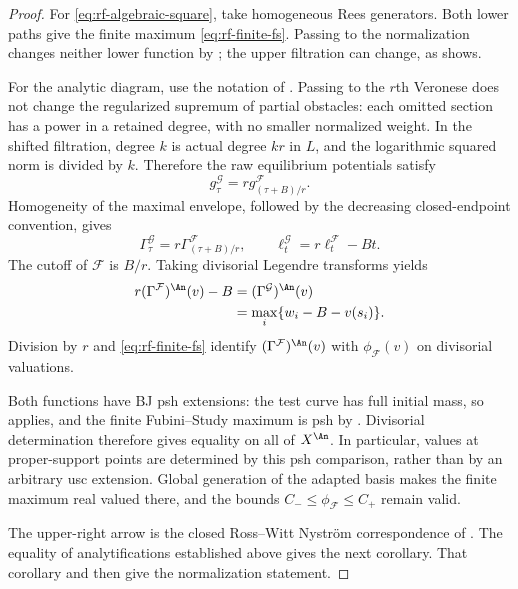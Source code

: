 \begin{proof}
For \eqref{eq:rf-algebraic-square}, take homogeneous Rees generators. Both lower paths give the finite maximum \eqref{eq:rf-finite-fs}. Passing to the normalization changes neither lower function by ; the upper filtration can change, as  shows.

For the analytic diagram, use the notation of . Passing to the $r$th Veronese does not change the regularized supremum of partial obstacles: each omitted section has a power in a retained degree, with no smaller normalized weight. In the shifted filtration, degree $k$ is actual degree $kr$ in $L$, and the logarithmic squared norm is divided by $k$. Therefore the raw equilibrium potentials satisfy
\[
                   g^{\mathcal G}_\tau
                      =r g^{\mathcal F}_{(\tau+B)/r}.
\]
Homogeneity of the maximal envelope, followed by the decreasing closed-endpoint convention, gives
\[
 \Gamma^{\mathcal G}_\tau=r\Gamma^{\mathcal F}_{(\tau+B)/r},
 \qquad
 \ell^{\mathcal G}_t=r\ell^{\mathcal F}_t-Bt.
\]
The cutoff of $\mathcal F$ is $B/r$. Taking divisorial Legendre transforms yields
\[
 \begin{aligned}
 r(\Gamma^{\mathcal F})^{\An}(v)-B
   &=(\Gamma^{\mathcal G})^{\An}(v)\\
   &=\max_i\{w_i-B-v(s_i)\}.
 \end{aligned}
\]
Division by $r$ and \eqref{eq:rf-finite-fs} identify $(\Gamma^{\mathcal F})^{\An}(v)$ with $\phi_{\mathcal F}(v)$ on divisorial valuations.

Both functions have BJ psh extensions: the test curve has full initial mass, so  applies, and the finite Fubini--Study maximum is psh by . Divisorial determination \cite[Theorem~4.22 and Corollary~4.23, p.~715]{BJ22} therefore gives equality on all of $X^{\An}$. In particular, values at proper-support points are determined by this psh comparison, rather than by an arbitrary usc extension. Global generation of the adapted basis makes the finite maximum real valued there, and the bounds $C_-\leq\phi_{\mathcal F}\leq C_+$ remain valid.

The upper-right arrow is the closed Ross--Witt Nystr\"om correspondence of . The equality of analytifications established above gives the next corollary. That corollary and  then give the normalization statement.
\end{proof}

